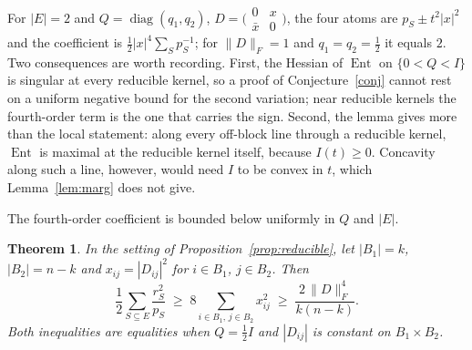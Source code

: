 \documentclass[11pt]{amsart}
\newtheorem{theorem}{Theorem}[section]
\theoremstyle{remark}
\numberwithin{equation}{section}
\newcommand{\Ent}{\operatorname{Ent}}
\begin{document}
For $|E|=2$ and $Q=\operatorname{diag}(q_1,q_2)$, $D=\bigl(\begin{smallmatrix}0&x\\\bar x&0\end{smallmatrix}\bigr)$, the four atoms are $p_S\pm t^2|x|^2$ and the coefficient is $\frac12|x|^4\sum_S p_S^{-1}$; for $\|D\|_F=1$ and $q_1=q_2=\frac12$ it equals $2$. Two consequences are worth recording. First, the Hessian of $\Ent$ on $\{0<Q<I\}$ is singular at every reducible kernel, so a proof of Conjecture~\ref{conj} cannot rest on a uniform negative bound for the second variation; near reducible kernels the fourth-order term is the one that carries the sign. Second, the lemma gives more than the local statement: along every off-block line through a reducible kernel, $\Ent$ is maximal at the reducible kernel itself, because $I(t)\ge0$. Concavity along such a line, however, would need $I$ to be convex in $t$, which Lemma~\ref{lem:marg} does not give.

The fourth-order coefficient is bounded below uniformly in $Q$ and $|E|$.

\begin{theorem}\label{thm:quartic}
In the setting of Proposition~\ref{prop:reducible}, let $|B_1|=k$, $|B_2|=n-k$ and $x_{ij}=|D_{ij}|^2$ for $i\in B_1$, $j\in B_2$. Then
\[
\frac12\sum_{S\subseteq E}\frac{r_S^2}{p_S}\;\ge\;8\sum_{i\in B_1,\,j\in B_2}x_{ij}^2\;\ge\;\frac{2\,\|D\|_F^4}{k(n-k)}.
\]
Both inequalities are equalities when $Q=\frac12I$ and $|D_{ij}|$ is constant on $B_1\times B_2$.
\end{theorem}
\end{document}
